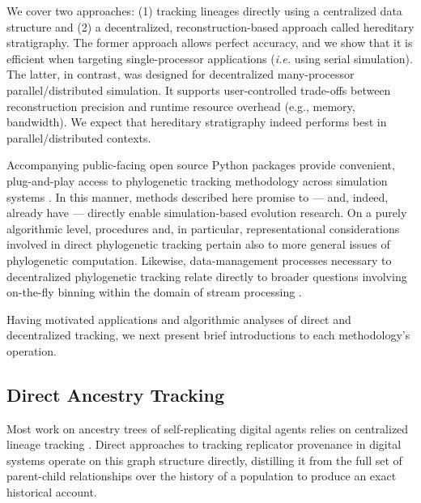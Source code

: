 
We cover two approaches: (1) tracking lineages directly using a centralized data structure and (2) a decentralized, reconstruction-based approach called hereditary stratigraphy.
The former approach allows perfect accuracy, and we show that it is efficient when targeting single-processor applications (\textit{i.e.} using serial simulation).
The latter, in contrast, was designed for decentralized many-processor parallel/distributed simulation.
It supports user-controlled trade-offs between reconstruction precision and runtime resource overhead (e.g., memory, bandwidth).
We expect that hereditary stratigraphy indeed performs best in parallel/distributed contexts.

Accompanying public-facing open source Python packages provide convenient, plug-and-play access to phylogenetic tracking methodology across simulation systems \citep{moreno2022hstrat,dolson2023phylotrackpy}.
In this manner, methods described here promise to --- and, indeed, already have --- directly enable simulation-based evolution research.
On a purely algorithmic level, procedures and, in particular, representational considerations involved in direct phylogenetic tracking pertain also to more general issues of phylogenetic computation.
Likewise, data-management processes necessary to decentralized phylogenetic tracking relate directly to broader questions involving on-the-fly binning within the domain of stream processing \citep{moreno2024algorithms}.

Having motivated applications and algorithmic analyses of direct and decentralized tracking, we next present brief introductions to each methodology's operation.

\subsection{Direct Ancestry Tracking}

Most work on ancestry trees of self-replicating digital agents relies on centralized lineage tracking \citep{friggeri2014rumor,cohen1987computer,dolson2023phylotrackpy}.
Direct approaches to tracking replicator provenance in digital systems operate on this graph structure directly, distilling it from the full set of parent-child relationships over the history of a population to produce an exact historical account.

